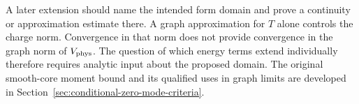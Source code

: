 A later extension should name the intended form domain and prove a
continuity or approximation estimate there. A graph approximation
for \(T\) alone controls the charge norm. Convergence in that norm
does not provide convergence in the graph norm of \(V_{\rm phys}\).
The question of which energy terms extend individually therefore
requires analytic input about the proposed domain. The
original smooth-core moment bound and its qualified uses in graph
limits are developed in Section~\ref{sec:conditional-zero-mode-criteria}.
